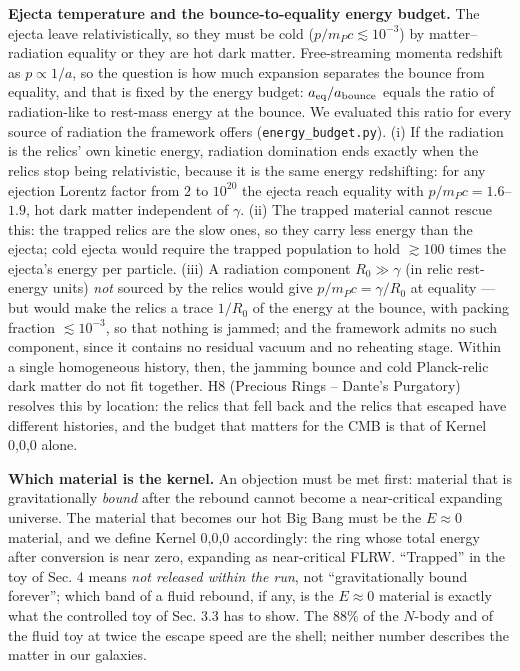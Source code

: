 \documentclass[
  11pt,
]{article}
\begin{document}
\textbf{Ejecta temperature and the bounce-to-equality energy budget.}
The ejecta leave relativistically, so they must be cold
(\(p/m_Pc \lesssim 10^{-3}\)) by matter--radiation equality or they are
hot dark matter. Free-streaming momenta redshift as \(p \propto 1/a\),
so the question is how much expansion separates the bounce from
equality, and that is fixed by the energy budget:
\(a_{\rm eq}/a_{\rm bounce}\) equals the ratio of radiation-like to
rest-mass energy at the bounce. We evaluated this ratio for every source
of radiation the framework offers (\texttt{energy\_budget.py}). (i) If
the radiation is the relics' own kinetic energy, radiation domination
ends exactly when the relics stop being relativistic, because it is the
same energy redshifting: for any ejection Lorentz factor from \(2\) to
\(10^{20}\) the ejecta reach equality with \(p/m_Pc = 1.6\)--\(1.9\),
hot dark matter independent of \(\gamma\). (ii) The trapped material
cannot rescue this: the trapped relics are the slow ones, so they carry
less energy than the ejecta; cold ejecta would require the trapped
population to hold \(\gtrsim 100\) times the ejecta's energy per
particle. (iii) A radiation component \(R_0 \gg \gamma\) (in relic
rest-energy units) \emph{not} sourced by the relics would give
\(p/m_Pc = \gamma/R_0\) at equality --- but would make the relics a
trace \(1/R_0\) of the energy at the bounce, with packing fraction
\(\lesssim 10^{-3}\), so that nothing is jammed; and the framework
admits no such component, since it contains no residual vacuum and no
reheating stage. Within a single homogeneous history, then, the jamming
bounce and cold Planck-relic dark matter do not fit together. H8
(Precious Rings -- Dante's Purgatory) resolves this by location: the
relics that fell back and the relics that escaped have different
histories, and the budget that matters for the CMB is that of Kernel
0,0,0 alone.

\textbf{Which material is the kernel.} An objection must be met first:
material that is gravitationally \emph{bound} after the rebound cannot
become a near-critical expanding universe. The material that becomes our
hot Big Bang must be the \(E \approx 0\) material, and we define Kernel
0,0,0 accordingly: the ring whose total energy after conversion is near
zero, expanding as near-critical FLRW. ``Trapped'' in the toy of Sec. 4
means \emph{not released within the run}, not ``gravitationally bound
forever''; which band of a fluid rebound, if any, is the \(E \approx 0\)
material is exactly what the controlled toy of Sec. 3.3 has to show. The
\(88\%\) of the \(N\)-body and of the fluid toy at twice the escape
speed are the shell; neither number describes the matter in our
galaxies.
\end{document}

